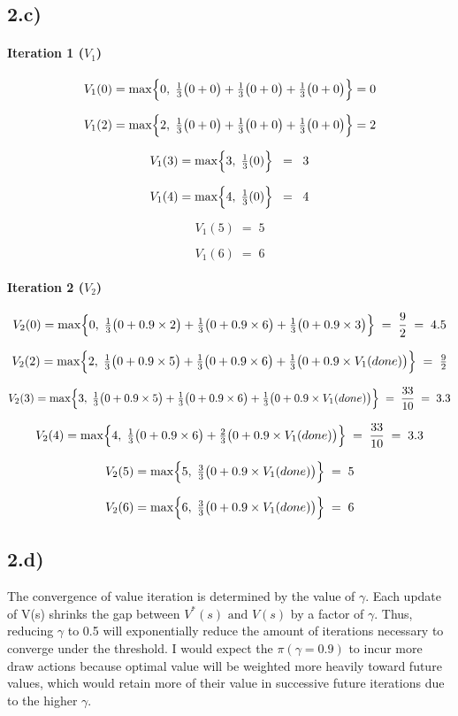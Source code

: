 \documentclass[11pt]{article}
\begin{document}
\subsection*{2.c)}

\paragraph{Iteration 1 (\(V_1\))}
\[
V_1(0)
= \max\Bigl\{
0,\;
\tfrac{1}{3}\bigl(0 + 0\bigr)
+ \tfrac{1}{3}\bigl(0 + 0\bigr)
+ \tfrac{1}{3}\bigl(0 + 0\bigr)
\Bigr\}
= 0
\]

\[
V_1(2)
= \max\Bigl\{
2,\;
\tfrac{1}{3}\bigl(0 + 0\bigr)
+ \tfrac{1}{3}\bigl(0 + 0\bigr)
+ \tfrac{1}{3}\bigl(0 + 0\bigr)
\Bigr\}
= 2
\]

\[
V_1(3)
= \max\Bigl\{
3,\;
\tfrac{1}{3}(0)
\Bigr\}
\;\;=\;\;3
\]

\[
V_1(4)
= \max\Bigl\{
4,\;
\tfrac{1}{3}(0)
\Bigr\}
\;\;=\;\;4
\]

\[
V_1(5) \;=\; 5
\]

\[
V_1(6) \;=\; 6
\]

\paragraph{Iteration 2 (\(V_2\))}

\[
V_2(0)
= \max\Bigl\{
0,\;
\tfrac{1}{3}\bigl(0 + 0.9 \times 2\bigr)
+ \tfrac{1}{3}\bigl(0 + 0.9 \times 6\bigr)
+ \tfrac{1}{3}\bigl(0 + 0.9 \times 3\bigr)
\Bigr\}
\;=\;
\frac{9}{2}
\;=\;
4.5
\]

\[
V_2(2)
= \max\Bigl\{
2,\;
\tfrac{1}{3}\bigl(0 + 0.9 \times 5\bigr)
+ \tfrac{1}{3}\bigl(0 + 0.9 \times 6\bigr)
+ \tfrac{1}{3}\bigl(0 + 0.9 \times V_1(done)\bigr)
\Bigr\}
\;=\;\tfrac{9}{2}
\]

\[
V_2(3)
= \max\Bigl\{
3,\;
\tfrac{1}{3}\bigl(0 + 0.9 \times 5\bigr)
+ \tfrac{1}{3}\bigl(0 + 0.9 \times 6\bigr)
+ \tfrac{1}{3}\bigl(0 + 0.9 \times V_1(done)\bigr)
\Bigr\}
\;=\;
\frac{33}{10}
\;=\;
3.3
\]

\[
V_2(4)
= \max\Bigl\{
4,\;
\tfrac{1}{3}\bigl(0 + 0.9 \times 6\bigr)
+ \tfrac{2}{3}\bigl(0 + 0.9 \times V_1(done)\bigr)
\Bigr\}
\;=\;
\frac{33}{10}
\;=\;
3.3
\]

\[
V_2(5)
= \max\Bigl\{
5,\;
\tfrac{3}{3}\bigl(0 + 0.9 \times V_1(done)\bigr)
\Bigr\}
\;=\;
5
\]

\[
V_2(6)
= \max\Bigl\{
6,\;
\tfrac{3}{3}\bigl(0 + 0.9 \times V_1(done)\bigr)
\Bigr\}
\;=\;
6
\]
\subsection*{2.d)}
The convergence of value iteration is determined by the value of $\gamma$. Each update of V(s) shrinks the gap between $V^*(s) \text{ and } V(s)$ by
a factor of $\gamma$. Thus, reducing $\gamma$ to 0.5 will exponentially reduce the amount of iterations necessary to converge under the threshold.
I would expect the $\pi(\gamma = 0.9)$ to incur more draw actions because optimal value will be weighted more heavily toward future values, which
would retain more of their value in successive future iterations due to the higher $\gamma$.
\end{document}
